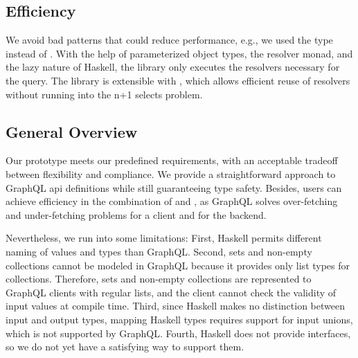 \begin{frame}
\subsection{Efficiency} We avoid bad patterns that could reduce performance, e.g., we used the type  instead of . 
With the help of parameterized object types, the resolver monad, and the lazy nature of Haskell, the library only executes the resolvers necessary for the query. The library is extensible with \HAXL{}, which allows efficient reuse of resolvers without running into the n+1 selects problem.

\subsection*{General Overview}

Our prototype meets our predefined requirements, with an acceptable tradeoff between flexibility and compliance. We provide a straightforward approach to GraphQL \gls{api} definitions while still guaranteeing type safety. Besides, users can achieve efficiency in the combination of \Morpheus{} and \HAXL{}, as GraphQL solves over-fetching and under-fetching problems for a client and  \HAXL{} for the backend.

Nevertheless, we run into some limitations: First, Haskell permits different naming of values and types than GraphQL. Second, sets and non-empty collections cannot be modeled in GraphQL because it provides only list types for collections. Therefore, sets and non-empty collections are represented to GraphQL clients with regular lists, and the client cannot check the validity of input values at compile time. Third, since Haskell makes no distinction between input and output types, mapping Haskell types requires support for input unions, which is not supported by GraphQL. Fourth, Haskell does not provide interfaces, so we do not yet have a satisfying way to support them. 
\end{frame}
